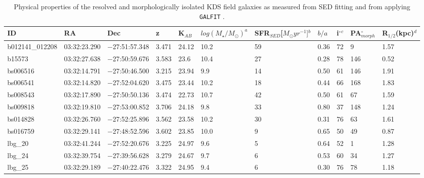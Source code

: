 \documentclass[fleqn,usenatbib]{mn2e}
\begin{document}
\begin{table*}
\centering
\begin{threeparttable}
\caption{Physical properties of the resolved and morphologically isolated KDS field galaxies as measured from SED fitting and from applying {\tt GALFIT} \protect\citep{Peng2010_galfit}.}
\label{tab:phys-props}
\begin{tabular}{lllllllllll}


 \hline
ID              & RA       & Dec       & z     & K$_{AB}$     & $log(M_{\star}/M_{\odot})^{a}$ & SFR$_{SED}$[$M_{\odot}yr^{-1}]$$^{b}$ & $b/a$ & i$^{\circ}$$^{c}$ & PA$_{morph}^{\circ}$ & R$_{1/2}$(kpc)$^{d}$ \\
 \hline
b012141\_012208 & 03:32:23.290 & $-$27:51:57.348 & 3.471        & 24.12  & 10.2 & 59 & 0.36        & 72        & 9     & 1.57      \\
b15573          & 03:32:27.638 & $-$27:50:59.676 & 3.583        & 23.6   & 10.4 & 27 & 0.28        & 78        & 146   & 0.52      \\
bs006516        & 03:32:14.791 & $-$27:50:46.500 & 3.215        & 23.94  & 9.9  & 14 & 0.50         & 61        & 146   & 1.91      \\
bs006541        & 03:32:14.820 & $-$27:52:04.620 & 3.475       & 23.44  & 10.2 & 18 & 0.44        & 66        & 168   & 1.83      \\
bs008543        & 03:32:17.890 & $-$27:50:50.136 & 3.474        & 22.73  & 10.7 & 42 & 0.50         & 61        & 67    & 1.59      \\
bs009818        & 03:32:19.810 & $-$27:53:00.852 & 3.706        & 24.18  & 9.8  & 33 & 0.80         & 37        & 148   & 1.24      \\
bs014828        & 03:32:26.760 & $-$27:52:25.896 & 3.562        & 23.58  & 10.2 & 30 & 0.31        & 76        & 63    & 1.61      \\
bs016759        & 03:32:29.141 & $-$27:48:52.596 & 3.602       & 23.85  & 10.0  & 9  & 0.65        & 50        & 49    & 0.87      \\
lbg\_20         & 03:32:41.244 & $-$27:52:20.676 & 3.225        & 24.97  & 9.6  & 5  & 0.64        & 52        & 1     & 1.28      \\
lbg\_24         & 03:32:39.754 & $-$27:39:56.628 & 3.279       & 24.67  & 9.7  & 6  & 0.53        & 60        & 34    & 1.27      \\
lbg\_25         & 03:32:29.189 & $-$27:40:22.476 & 3.322        & 24.95  & 9.4  & 6  & 0.30         & 76        & 78    & 1.18      \\

\end{tabular}
\end{threeparttable}
\end{table*}
\end{document}
